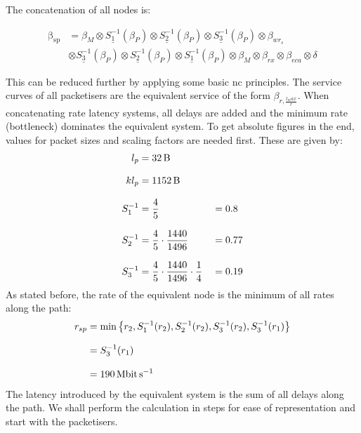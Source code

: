 The concatenation of all nodes is:

\begin{equation}
\begin{aligned}
\mathrm{\beta_{sp}} &=   \beta_{M} \otimes \underline{S^{-1}_1} \left ( \beta_{P}\right) \otimes \underline{S^{-1}_2} \left ( \beta_{P}\right) \otimes \underline{S^{-1}_3} \left ( \beta_{P} \right) \otimes \beta_{wr_s}\\
&\otimes  \underline{S^{-1}_3} \left ( \beta_{P}\right)  \otimes \underline{S^{-1}_2} \left ( \beta_{P} \right) \otimes \underline{S^{-1}_1} \left ( \beta_{P} \right) \otimes   \beta_{M} \otimes \beta_{rx} \otimes \beta_{eca} \otimes \delta
\label{eq:sp-serv}
\end{aligned}
\end{equation}

This can be reduced further by applying some basic \gls{nc} principles. The service curves of all packetisers are the equivalent service of the form $\beta_{r,\frac{l_max}{r}}$. When concatenating rate latency systems, all delays are added and
the minimum rate (bottleneck) dominates the equivalent system. 
To get absolute figures in the end, values for packet sizes and scaling factors are needed first. These are given by:
\begin{equation}
\begin{aligned}
l_p &= \SI{32}{\byte}&&~\\[8pt]
kl_p &= \SI{1152}{\byte}&&~\\[8pt]
S^{-1}_1 &= \frac{4}{5} &&= 0.8\\[8pt]
S^{-1}_2 &= \frac{4}{5}\cdot \frac{1440}{1496} &&= 0.77\\[8pt]
S^{-1}_3 &= \frac{4}{5}\cdot \frac{1440}{1496} \cdot \frac{1}{4} &&= 0.19
\label{eq:scalings}
\end{aligned}
\end{equation}
%
As stated before, the rate of the equivalent node is the minimum of all rates along the path:
%
\begin{equation}
\begin{aligned}
r_{sp} &= \min\left\{r_2, S^{-1}_1(r_2), S^{-1}_2(r_2), S^{-1}_3(r_2), S^{-1}_3(r_1) \right\}\\[8pt]
 &= S^{-1}_3(r_1)\\[8pt]
 &= \SI{190}{\mega\bit\per\second}
\end{aligned}
\end{equation}
%
The latency introduced by the equivalent system is the sum of all delays along the path. We shall perform the calculation in steps for ease of representation and start with the packetisers.
